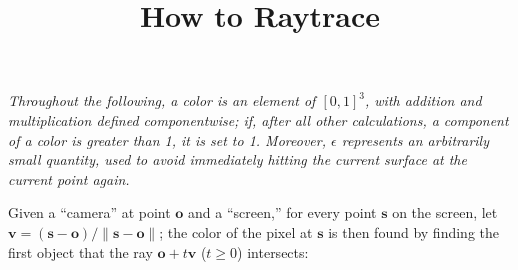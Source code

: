 \documentclass{article}
\title{How to Raytrace}
\renewcommand{\v}{\mathbf}
\begin{document}
\maketitle

\emph{Throughout the following, a color is an element of $[0,1]^3$, with
addition and multiplication defined componentwise; if, after all other
calculations, a component of a color is greater than 1, it is set to 1.
Moreover, $\epsilon$ represents an arbitrarily small quantity, used to avoid
immediately hitting the current surface at the current point again.}

\vspace{2ex}

Given a ``camera'' at point $\v{o}$ and a ``screen,'' for every point $\v{s}$ on the screen, let $\v{v} = (\v{s}-\v{o})/\|\v{s}-\v{o}\|$; the color of the pixel at $\v{s}$ is then found by finding the first object that the ray $\v{o}+t\v{v}$ ($t\geq 0$) intersects:
\end{document}
